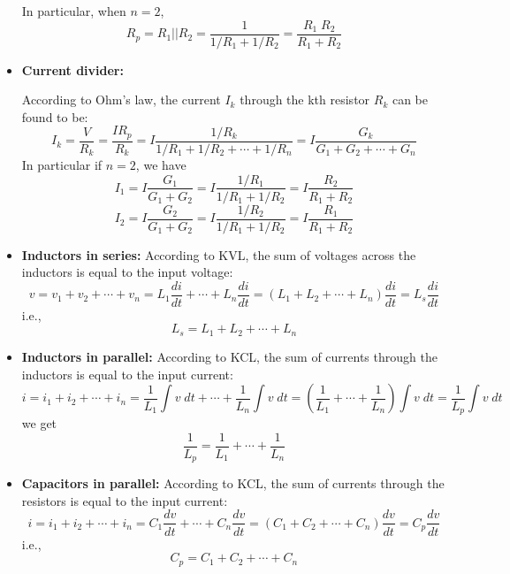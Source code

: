 \documentclass{article}
\begin{document}
\begin{itemize}
  In particular, when $n=2$, 
  \begin{equation}
    R_p=R_1||R_2=\frac{1}{1/R_1+1/R_2}=\frac{R_1\;R_2}{R_1+R_2}	
  \end{equation}

\item {\bf Current divider:}

  According to Ohm's law, the current $I_k$ through the kth resistor $R_k$ can be 
  found to be:
  \begin{equation} 
    I_k=\frac{V}{R_k}=\frac{IR_p}{R_k}=I\frac{1/R_k}{1/R_1+1/R_2+\cdots+1/R_n}
    =I\frac{G_k}{G_1+G_2+\cdots+G_n} 
  \end{equation}
  In particular if $n=2$, we have
  \begin{equation} 
    I_1=I\frac{G_1}{G_1+G_2}=I\frac{1/R_1}{1/R_1+1/R_2}
    =I\frac{R_2}{R_1+R_2}
  \end{equation}
  \begin{equation}
    I_2=I\frac{G_2}{G_1+G_2}=I\frac{1/R_2}{1/R_1+1/R_2}
    =I\frac{R_1}{R_1+R_2} 
  \end{equation}

\item {\bf Inductors in series:} According to KVL, the sum of voltages across 
  the inductors is equal to the input voltage:
  \begin{equation}	
    v=v_1+v_2+\cdots+v_n=L_1\frac{di}{dt}+\cdots+L_n\frac{di}{dt}
    =(L_1+L_2+\cdots+L_n)\frac{di}{dt}=L_s\frac{di}{dt}	
  \end{equation}
  i.e.,
  \begin{equation}
    L_s=L_1+L_2+\cdots+L_n	
  \end{equation}

\item {\bf Inductors in parallel:} According to KCL, the sum of currents through 
  the inductors is equal to the input current:
  \begin{equation}	
    i=i_1+i_2+\cdots+i_n
    =\frac{1}{L_1}\int v\; dt+\cdots+\frac{1}{L_n}\int v\; dt 
    =\left(\frac{1}{L_1}+\cdots+\frac{1}{L_n}\right)\int v\; dt
    =\frac{1}{L_p}\int v\; dt	 
  \end{equation}
  we get
  \begin{equation}
    \frac{1}{L_p}=\frac{1}{L_1}+\cdots+\frac{1}{L_n} 
  \end{equation}

\item {\bf Capacitors in parallel:} According to KCL, the sum of currents through 
  the resistors is equal to the input current:
  \begin{equation}	
    i=i_1+i_2+\cdots+i_n=C_1\frac{dv}{dt}+\cdots+C_n\frac{dv}{dt}
    =(C_1+C_2+\cdots+C_n)\frac{dv}{dt} =C_p\frac{dv}{dt}		
  \end{equation}
  i.e.,
  \begin{equation}	
    C_p=C_1+C_2+\cdots+C_n	
  \end{equation}


\end{itemize}
\end{document}
